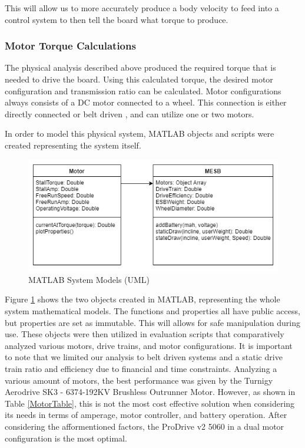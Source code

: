 \documentclass[titlepage, letterpaper,12pt]{article}
\begin{document}
This will allow us to more accurately produce a body velocity to feed into a control system to then tell the board what torque to produce.

\subsubsection{Motor Torque Calculations}
The physical analysis described above produced the required torque that is needed to drive the board. Using this calculated torque, the desired motor configuration and transmission ratio can be calculated. Motor configurations always consists of a DC motor connected to a wheel. This connection is either directly connected \cite{DirectConnect} or belt driven \cite{BeltConnect}, and can utilize one or two motors.

In order to model this physical system, MATLAB objects and scripts were created representing the system itself.

\begin{figure}[h!]
    \centering
    \includegraphics[width=12cm]{MotorSelFigs/UML_BEST.png}
    \caption{MATLAB System Models (UML)}
    \label{MotorUML}
\end{figure}

Figure \ref{MotorUML} shows the two objects created in MATLAB, representing the whole system mathematical models. The functions and properties all have public access, but properties are set as immutable. This will allows for safe manipulation during use. These objects were then utilized in evaluation scripts that comparatively analyzed various motors, drive trains, and motor configurations. It is important to note that we limited our analysis to belt driven systems and a static drive train ratio and efficiency due to financial and time constraints. Analyzing a various amount of motors, the best performance was given by the Turnigy Aerodrive SK3 - 6374-192KV Brushless Outrunner Motor. However, as shown in Table \ref{MotorTable}, this is not the most cost effective solution when considering its needs in terms of amperage, motor controller, and battery operation. After considering the afformentioned factors, the ProDrive v2 5060 in a dual motor configuration is the most optimal.
\end{document}
